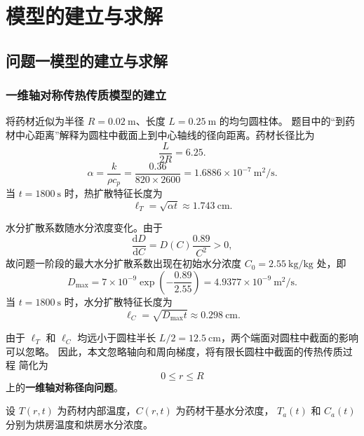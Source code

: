 \documentclass[12pt,a4paper]{article}
\begin{document}
\section{模型的建立与求解}


\subsection{问题一模型的建立与求解}

\subsubsection{一维轴对称传热传质模型的建立}

将药材近似为半径 $R=0.02\ \mathrm{m}$、长度 $L=0.25\ \mathrm{m}$ 的均匀圆柱体。
题目中的“到药材中心距离”解释为圆柱中截面上到中心轴线的径向距离。药材长径比为
\begin{equation}
\frac{L}{2R}=6.25.
\end{equation}
\begin{equation}
\alpha=\frac{k}{\rho c_p}
=\frac{0.36}{820\times2600}
=1.6886\times10^{-7}\ \mathrm{m^2/s}.
\end{equation}
当 $t=1800\ \mathrm{s}$ 时，热扩散特征长度为
\begin{equation}
\ell_T=\sqrt{\alpha t}\approx1.743\ \mathrm{cm}.
\end{equation}

水分扩散系数随水分浓度变化。由于
\begin{equation}
\frac{\mathrm{d}D}{\mathrm{d}C}
=
D(C)\frac{0.89}{C^2}>0,
\end{equation}
故问题一阶段的最大水分扩散系数出现在初始水分浓度
$C_0=2.55\ \mathrm{kg/kg}$ 处，即
\begin{equation}
D_{\max}
=
7\times10^{-9}
\exp\left(-\frac{0.89}{2.55}\right)
=
4.9377\times10^{-9}\ \mathrm{m^2/s}.
\end{equation}
当 $t=1800\ \mathrm{s}$ 时，水分扩散特征长度为
\begin{equation}
\ell_C=\sqrt{D_{\max}t}\approx0.298\ \mathrm{cm}.
\end{equation}

由于 $\ell_T$ 和 $\ell_C$ 均远小于圆柱半长
$L/2=12.5\ \mathrm{cm}$，两个端面对圆柱中截面的影响可以忽略。
因此，本文忽略轴向和周向梯度，将有限长圆柱中截面的传热传质过程
简化为
\begin{equation}
0\le r\le R
\end{equation}
上的\textbf{一维轴对称径向问题}。

设 $T(r,t)$ 为药材内部温度，$C(r,t)$ 为药材干基水分浓度，
$T_a(t)$ 和 $C_a(t)$ 分别为烘房温度和烘房水分浓度。
\end{document}
